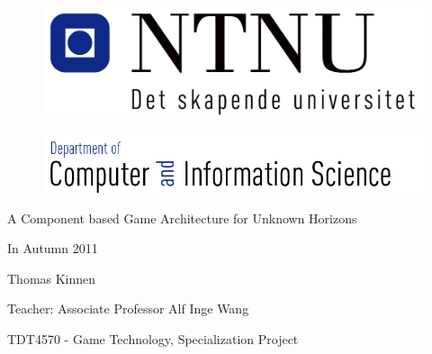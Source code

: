 \pagestyle{empty}

\begin{titlepage}
\begin{center}

\begin{figure}[!htb]
	\begin{center}
		\includegraphics[scale=0.50]{pics/ntnu}
	\end{center}
\end{figure}
\begin{figure}[!htb]
	\begin{center}
		\includegraphics[scale=0.40]{pics/idi}
	\end{center}
\end{figure}
\begin{LARGE}
\vspace{1.2in}

\end{LARGE}
\begin{Huge}
A Component based Game Architecture for Unknown Horizons
\end{Huge}
\begin{LARGE}

In Autumn 2011

\vspace{1.2in}
\vspace{1.2in}

Thomas Kinnen 



Teacher: Associate Professor Alf Inge Wang

\vspace{0.7in}

\end{LARGE}

\begin{Large}
TDT4570 - Game Technology, Specialization Project
\vspace{0.8in}
\end{Large}



\end{center}

\end{titlepage}
